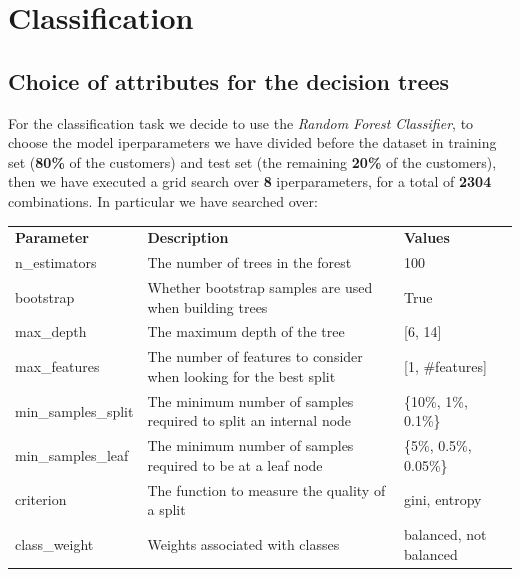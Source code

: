 \chapter{Classification}

\section{Choice of attributes for the decision trees}

For the classification task we decide to use the \textit{Random Forest Classifier}, to choose the model iperparameters we have divided before the dataset in training set (\textbf{80\%} of the customers) and test set (the remaining \textbf{20\%} of the customers), then we have executed a grid search over \textbf{8} iperparameters, for a total of \textbf{2304} combinations. In particular we have searched over:

\begin{table}[h]
\centering
\begin{adjustbox}{width=1\textwidth}
\small
\begin{tabular}{lll}
\textbf{Parameter}       & \textbf{Description}    & \textbf{Values} \\ \rowcolor[HTML]{EFEFEF} 
n\_estimators            & The number of trees in the forest                                  & 100                                          \\
bootstrap                & Whether bootstrap samples are used when building trees             & True                                         \\ \rowcolor[HTML]{EFEFEF} 
max\_depth               & The maximum depth of the tree                                      & [6, 14]                                         \\           
max\_features            & The number of features to consider when looking for the best split & [1, \#features]        \\ \rowcolor[HTML]{EFEFEF}
min\_samples\_split      & The minimum number of samples required to split an internal node   & \{10\%, 1\%, 0.1\%\}                                         \\ 
min\_samples\_leaf       & The minimum number of samples required to be at a leaf node        & \{5\%, 0.5\%, 0.05\%\}                   \\ \rowcolor[HTML]{EFEFEF}
criterion                & The function to measure the quality of a split                     & gini, entropy                                        \\ 
class\_weight            & Weights associated with classes                                    & balanced, not balanced                           

\end{tabular}
\end{adjustbox}
\end{table}


